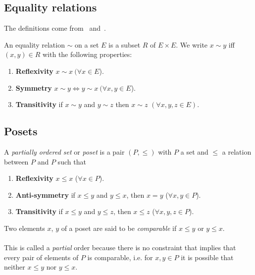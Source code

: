 \subsection{Equality relations}

The definitions come from~\cite{incidenceGeometry} and~\cite{polytopes}.

\begin{definition}
  An equality relation $\sim$ on a set $E$ is a subset $R$ of $E \times E$. We write $x \sim y$ iff $(x,y) \in R$ with the following properties:
  \begin{enumerate}
    \item \textbf{Reflexivity} $x \sim x \ (\forall x \in E$).
    \item \textbf{Symmetry} $x \sim y \Leftrightarrow y\sim x \ (\forall x,y \in E$).
    \item \textbf{Transitivity} if $x \sim y$ and $y \sim z$ then $x \sim z$ $(\forall x,y,z \in E)$.
  \end{enumerate}
\end{definition}

\subsection{Posets}

\begin{definition}
  A \textit{partially ordered set} or \textit{poset} is a pair $(P,\le)$ with $P$ a set and $\le$ a relation between $P$ and $P$ such that
  \begin{enumerate}
    \item \textbf{Reflexivity} $x \le x$ ($\forall x \in P$).
    \item \textbf{Anti-symmetry} if $x \le y$ and $y \le x$, then $x = y$ ($\forall x,y \in P$).
    \item \textbf{Transitivity} if $x \le y$ and $y \le z$, then $x \le z$ ($\forall x,y,z \in P$).
  \end{enumerate}
\end{definition}

\begin{definition}[Comparability]
  Two elements $x$, $y$ of a poset are said to be \textit{comparable} if $x \le y$ or $y \le x$.
\end{definition}

\paragraph{}
This is called a \textit{partial} order because there is no constraint that implies that every pair of elements of $P$ is comparable, i.e. for $x,y \in P$ it is possible that neither $x \le y$ nor $y \le x$.

